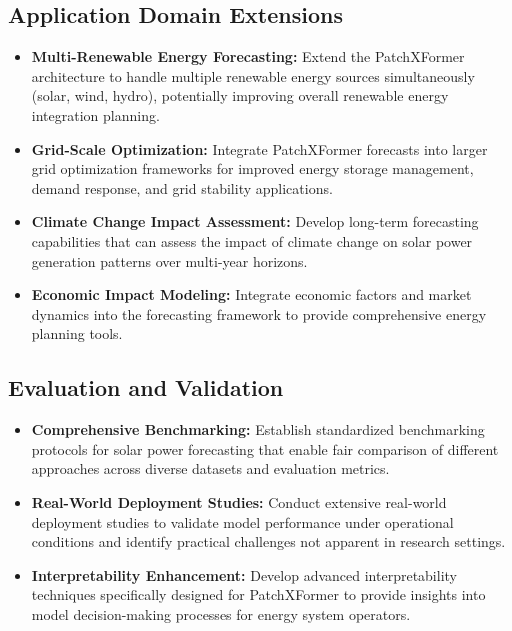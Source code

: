 \documentclass[12pt]{uomthesis}
\begin{document}
\subsection{Application Domain Extensions}

\begin{itemize}
    \item \textbf{Multi-Renewable Energy Forecasting:} Extend the PatchXFormer architecture to handle multiple renewable energy sources simultaneously (solar, wind, hydro), potentially improving overall renewable energy integration planning.
    
    \item \textbf{Grid-Scale Optimization:} Integrate PatchXFormer forecasts into larger grid optimization frameworks for improved energy storage management, demand response, and grid stability applications.
    
    \item \textbf{Climate Change Impact Assessment:} Develop long-term forecasting capabilities that can assess the impact of climate change on solar power generation patterns over multi-year horizons.
    
    \item \textbf{Economic Impact Modeling:} Integrate economic factors and market dynamics into the forecasting framework to provide comprehensive energy planning tools.
\end{itemize}

\subsection{Evaluation and Validation}

\begin{itemize}
    \item \textbf{Comprehensive Benchmarking:} Establish standardized benchmarking protocols for solar power forecasting that enable fair comparison of different approaches across diverse datasets and evaluation metrics.
    
    \item \textbf{Real-World Deployment Studies:} Conduct extensive real-world deployment studies to validate model performance under operational conditions and identify practical challenges not apparent in research settings.
    
    \item \textbf{Interpretability Enhancement:} Develop advanced interpretability techniques specifically designed for PatchXFormer to provide insights into model decision-making processes for energy system operators.
\end{itemize}
\end{document}
